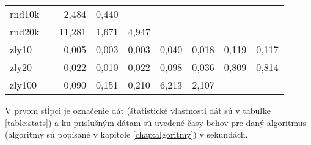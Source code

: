 \begin{table}[h]
\begin{tabular}{l|rrrrrrrr}
		rnd10k  &       & 2,484  & 0,440   &          &            &            &          &         \\
		rnd20k  &       & 11,281 & 1,671   & 4,947    &            &            &          &         \\
		zly10   &       & 0,005  & 0,003   & 0,003    & 0,040      & 0,018      & 0,119    & 0,117   \\
		zly20   &       & 0,022  & 0,010   & 0,022    & 0,098      & 0,036      & 0,809    & 0,814   \\
		zly100  &       & 0,090  & 0,151   & 0,210    & 6,213      & 2,107      &          &         \\ \hline
	\end{tabular}
	\smallskip \par
	V prvom stĺpci je označenie dát (štatistické vlastnosti dát sú v tabuľke 
	\ref{table:stats}) a ku prislušným dátam sú uvedené časy behov pre daný 
	algoritmus (algoritmy sú popísané v kapitole \ref{chap:algoritmy}) v 
	sekundách.
	\label{table:java-stare}
\end{table}

